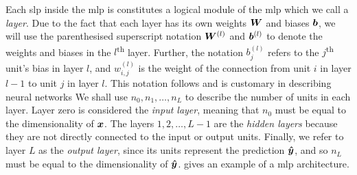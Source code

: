 \documentclass[../main.tex]{subfiles}
\begin{document}
Each \gls{slp} inside the \gls{mlp} is constitutes a logical module of the \gls{mlp} which we call a \emph{layer}.
Due to the fact that each layer has its own weights ${\bm{W}}$ and biases ${\bm{b}}$, we will use the parenthesised superscript notation ${\bm{W}}^{(l)}$ and ${\bm{b}}^{(l)}$ to denote the weights and biases in the $l$\textsuperscript{th} layer.
Further, the notation $b_j^{(l)}$ refers to the $j$\textsuperscript{th} unit's bias in layer $l$, and $w_{i,j}^{(l)}$ is the weight of the connection from unit $i$ in layer $l-1$ to unit $j$ in layer $l$.
This notation follows \textcite{goodfellow2016} and is customary in describing neural networks
We shall use $n_0,n_1,\dots,n_L$ to describe the number of units in each layer.
Layer zero is considered the \emph{input layer}, meaning that $n_0$ must be equal to the dimensionality of ${\bm{x}}$. 
The layers $1, 2, \dots, L-1$ are the \emph{hidden layers} because they are not directly connected to the input or output units.
Finally, we refer to layer $L$ as the \emph{output layer}, since its units represent the prediction ${\bm{\hat{y}}}$, and so $n_L$ must be equal to the dimensionality of ${\bm{\hat{y}}}$. 
 gives an example of a \gls{mlp} architecture.
\end{document}

